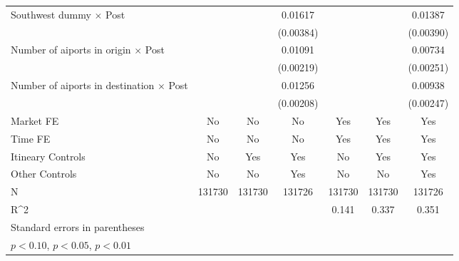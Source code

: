\begin{table}[htbp]
\begin{tabular}{l*{6}{c}}
\addlinespace
Southwest dummy $\times$ Post&                     &                     &     0.01617\sym{***}&                     &                     &     0.01387\sym{***}\\
                    &                     &                     &   (0.00384)         &                     &                     &   (0.00390)         \\
\addlinespace
Number of aiports in origin $\times$ Post&                     &                     &     0.01091\sym{***}&                     &                     &     0.00734\sym{***}\\
                    &                     &                     &   (0.00219)         &                     &                     &   (0.00251)         \\
\addlinespace
Number of aiports in destination $\times$ Post&                     &                     &     0.01256\sym{***}&                     &                     &     0.00938\sym{***}\\
                    &                     &                     &   (0.00208)         &                     &                     &   (0.00247)         \\
\midrule
Market FE           &          No         &          No         &          No         &         Yes         &         Yes         &         Yes         \\
Time FE             &          No         &          No         &          No         &         Yes         &         Yes         &         Yes         \\
Itineary Controls   &          No         &         Yes         &         Yes         &          No         &         Yes         &         Yes         \\
Other Controls      &          No         &          No         &         Yes         &          No         &          No         &         Yes         \\
N                   &      131730         &      131730         &      131726         &      131730         &      131730         &      131726         \\
R^2                 &                     &                     &                     &       0.141         &       0.337         &       0.351         \\
\bottomrule
\multicolumn{7}{l}{\footnotesize Standard errors in parentheses}\\
\multicolumn{7}{l}{\footnotesize \sym{*} \(p<0.10\), \sym{**} \(p<0.05\), \sym{***} \(p<0.01\)}\\
\end{tabular}
\end{table}
